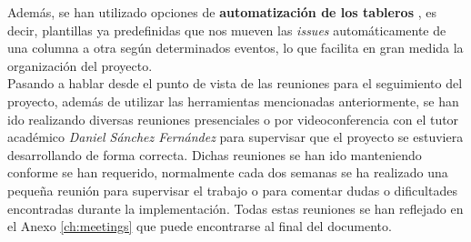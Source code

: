 Además, se han utilizado opciones de \textbf{automatización de los tableros}
\cite{automatic-project-board}, es decir, plantillas ya predefinidas que nos mueven las
\textit{issues} automáticamente de una columna a otra según determinados eventos, lo que
facilita en gran medida la organización del proyecto.\\

Pasando a hablar desde el punto de vista de las reuniones para el seguimiento del proyecto,
además de utilizar las herramientas mencionadas anteriormente, se han ido realizando diversas
reuniones presenciales o por videoconferencia con el tutor académico \textit{Daniel Sánchez
Fernández} para supervisar que el proyecto se estuviera desarrollando de forma correcta.
Dichas reuniones se han ido manteniendo conforme se han requerido, normalmente cada dos
semanas se ha realizado una pequeña reunión para supervisar el trabajo o para comentar dudas
o dificultades encontradas durante la implementación. Todas estas reuniones se han reflejado
en el Anexo \ref{ch:meetings} que puede encontrarse al final del documento.

